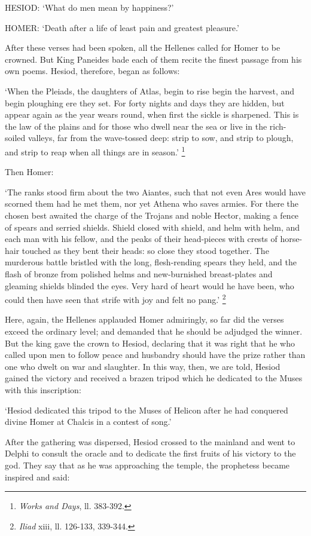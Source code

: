 HESIOD: ‘What do men mean by happiness?’

HOMER: ‘Death after a life of least pain and greatest pleasure.’

After these verses had been spoken, all the Hellenes called for Homer to be
crowned. But King Paneides bade each of them recite the finest passage from his
own poems. Hesiod, therefore, began as follows:

‘When the Pleiads, the daughters of Atlas, begin to rise begin the
harvest, and begin ploughing ere they set. For forty nights and days they are
hidden, but appear again as the year wears round, when first the sickle is
sharpened. This is the law of the plains and for those who dwell near the sea
or live in the rich-soiled valleys, far from the wave-tossed deep: strip to
sow, and strip to plough, and strip to reap when all things are in
season.’ \footnote{\emph{Works and
Days}, ll. 383-392.}

Then Homer:

‘The ranks stood firm about the two Aiantes, such that not even Ares
would have scorned them had he met them, nor yet Athena who saves armies. For
there the chosen best awaited the charge of the Trojans and noble Hector,
making a fence of spears and serried shields. Shield closed with shield, and
helm with helm, and each man with his fellow, and the peaks of their
head-pieces with crests of horse-hair touched as they bent their heads: so
close they stood together. The murderous battle bristled with the long,
flesh-rending spears they held, and the flash of bronze from polished helms and
new-burnished breast-plates and gleaming shields blinded the eyes. Very hard of
heart would he have been, who could then have seen that strife with joy and
felt no pang.’ \footnote{\emph{Iliad} xiii,
ll. 126-133, 339-344.}

Here, again, the Hellenes applauded Homer admiringly, so far did the verses
exceed the ordinary level; and demanded that he should be adjudged the winner.
But the king gave the crown to Hesiod, declaring that it was right that he who
called upon men to follow peace and husbandry should have the prize rather than
one who dwelt on war and slaughter. In this way, then, we are told, Hesiod
gained the victory and received a brazen tripod which he dedicated to the Muses
with this inscription:

‘Hesiod dedicated this tripod to the Muses of Helicon after he had
conquered divine Homer at Chalcis in a contest of song.’

After the gathering was dispersed, Hesiod crossed to the mainland and went to
Delphi to consult the oracle and to dedicate the first fruits of his victory to
the god. They say that as he was approaching the temple, the prophetess became
inspired and said:

